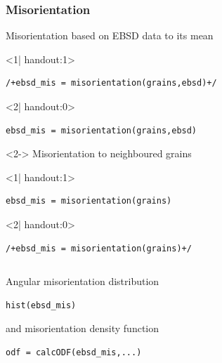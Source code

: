 \begin{frame}[fragile]
  \frametitle{Misorientation}


Misorientation based on EBSD data to its mean

\begin{onlyenv}<1| handout:1>
\begin{lstlisting}
/+ebsd_mis = misorientation(grains,ebsd)+/
\end{lstlisting}
\end{onlyenv}
\begin{onlyenv}<2| handout:0>
\begin{lstlisting}
ebsd_mis = misorientation(grains,ebsd)
\end{lstlisting}
\end{onlyenv}

\begin{uncoverenv}<2->
\medskip
Misorientation to neighboured grains
\begin{onlyenv}<1| handout:1>
\begin{lstlisting}
ebsd_mis = misorientation(grains)
\end{lstlisting}
\end{onlyenv}
\begin{onlyenv}<2| handout:0>
\begin{lstlisting}
/+ebsd_mis = misorientation(grains)+/
\end{lstlisting}
\end{onlyenv}

\end{uncoverenv}

\begin{columns}[t]
\begin{column}[T]{6.25cm}
\medskip
Angular misorientation distribution
\begin{lstlisting}
hist(ebsd_mis)
\end{lstlisting}

and misorientation density function
\begin{lstlisting}
odf = calcODF(ebsd_mis,...)
\end{lstlisting}


\end{column}
\end{columns}
\end{frame}
